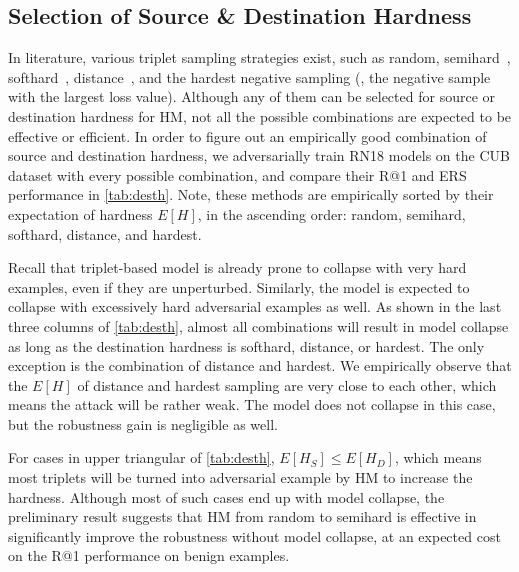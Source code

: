 \documentclass[10pt,twocolumn,letterpaper]{article}
\begin{document}
\subsection{Selection of Source \& Destination Hardness}




In literature, various triplet sampling strategies exist, such as random,
semihard~\cite{facenet}, softhard~\cite{revisiting}, distance~\cite{distance},
and the hardest negative sampling (\ie, the negative sample with the largest
loss value).
%
Although any of them can be selected for source or destination hardness for HM,
not all the possible combinations are expected to be effective or efficient.
%
In order to figure out an empirically good combination of source and
destination hardness, we adversarially train RN18 models on the CUB dataset
with every possible combination, and compare their R@1 and ERS performance in
\cref{tab:desth}.
%
Note, these methods are empirically sorted by their expectation of hardness
$E[H]$, in the ascending order: random, semihard, softhard, distance, and
hardest.


Recall that triplet-based model is already prone to collapse with very hard
examples, even if they are unperturbed.
%
Similarly, the model is expected to collapse with excessively hard adversarial
examples as well.
%
As shown in the last three columns of \cref{tab:desth}, almost all combinations
will result in model collapse as long as the destination hardness is softhard,
distance, or hardest.
%
The only exception is the combination of distance and hardest.
%
We empirically observe that the $E[H]$ of distance and hardest sampling are
very close to each other, which means the attack will be rather weak.
%
The model does not collapse in this case, but the robustness gain is negligible
as well.


For cases in upper triangular of \cref{tab:desth}, $E[H_S] \leqslant E[H_D]$,
which means most triplets will be turned into adversarial example by HM
to increase the hardness.
%
Although most of such cases end up with model collapse, the preliminary 
result suggests that HM from random to semihard is effective in significantly
improve the robustness without model collapse, at an expected cost on the R@1
performance on benign examples.
\end{document}
